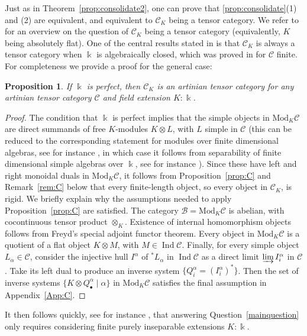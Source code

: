 \documentclass[11pt]{amsart}
\def\Ind{\operatorname{Ind}}
\def\cC{\mathscr{C}}
\def\bk{\Bbbk}
\def\Mod{\mathrm{Mod}}
\def\cB{\mathscr{B}}
\newtheorem{prop}[thm]{Proposition}
\theoremstyle{definition}
\theoremstyle{remark}
\numberwithin{equation}{section}
\begin{document}
Just as in Theorem~\ref{prop:consolidate2}, one can prove that \ref{prop:consolidate}(1) and (2) are equivalent, and equivalent to $\cC_K$ being a tensor category.
 We refer to \cite[\S 5]{CEOP} for an overview on the question of $\cC_K$ being a tensor category (equivalently, $K$ being absolutely flat). One of the central results stated in \cite{CEOP} is that $\cC_K$ is always a tensor category when $\bk$ is algebraically closed, which was proved in \cite[Lemma~2.2]{EO} for $\cC$ finite.
For completeness we provide a proof for the general case:
\begin{prop}\label{prop:FieldExt}
    If $\bk$ is perfect, then $\cC_K$ is an artinian tensor category for any artinian tensor category $\cC$ and field extension $K:\bk$.
\end{prop}
\begin{proof}
    The condition that $\bk$ is perfect implies that the simple objects in $\Mod_K\cC$ are direct summands of free $K$-modules $K\otimes L$, with $L$ simple in $\cC$ (this can be reduced to the corresponding statement for modules over finite dimensional algebras, see for instance \cite[Lemme~5.2(i)]{Del14}, in which case it follows from separability of finite dimensional simple algebras over $\bk$, see for instance \cite[Theorem~4.5.7]{Fo}). Since these have left and right monoidal duals in $\Mod_K\cC$, it follows from Proposition~\ref{prop:C} and Remark~\ref{rem:C} below that every finite-length object, so every object in $\cC_K$, is rigid. We briefly explain why the assumptions needed to apply Proposition~\ref{prop:C} are satisfied. The category $\cB=\Mod_K\cC$ is abelian, with cocontinuous tensor product $\otimes_K$. Existence of internal homomorphism objects follows from Freyd's special adjoint functor theorem.  Every object in $\Mod_K\cC$ is a quotient of a flat object $K\otimes M$, with $M\in\Ind\cC$. Finally, for every simple object $L_\alpha\in\cC$, consider the injective hull $I^\alpha$ of ${}^\ast L_\alpha$ in $\Ind\cC$ as a direct limit $\varinjlim I_i^\alpha$ in $\cC$.  Take its left dual to produce an inverse system $\{Q_i^\alpha=(I_i^\alpha)^\ast\}$. Then the set of inverse systems $\{K\otimes Q_{\bullet}^\alpha\mid \alpha\}$ in $\Mod_K\cC$ satisfies the final assumption in Appendix~\ref{App:C}.
\end{proof}

It then follows quickly, see for instance \cite[\S 5]{CEOP}, that answering Question~\ref{mainquestion} only requires considering finite purely inseparable extensions $K:\bk$. 
\end{document}
